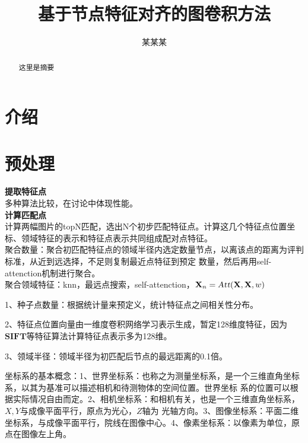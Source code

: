 \documentclass[10pt]{article}
\title{\textbf{基于节点特征对齐的图卷积方法}}
\author{某某某}
\date{}
\begin{document}
\maketitle
\setcounter{page}{0}
\maketitle
\thispagestyle{empty}
\begin{abstract}
	这里是摘要
\end{abstract}

\newpage
{}
\setcounter{page}{1}
\tableofcontents

\newpage
\section{介绍}

\section{预处理}
\indent \textbf{提取特征点}\\
\indent 多种算法比较，在讨论中体现性能。\\
\indent \textbf{计算匹配点}\\
\indent 计算两幅图片的topN匹配，选出N个初步匹配特征点。计算这几个特征点位置坐标、领域特征的表示和特征点表示共同组成配对点特征。\\
\indent 聚合数量：聚合初匹配特征点的领域半径内选定数量节点，以离该点的距离为评判标准，从近到远选择，不足则复制最近点特征到预定
数量，然后再用self-attenction机制进行聚合。\\
\indent 聚合领域特征：knn，最远点搜索，self-attenction，$\textbf{X}_n=\textsl{Att}(\textbf{X},\textbf{X},w)$ 

1、种子点数量：根据统计量来预定义，统计特征点之间相关性分布。

2、特征点位置向量由一维度卷积网络学习表示生成，暂定128维度特征，因为$\textbf{SIFT}$等特征算法计算特征点表示多为128维。

3、领域半径：领域半径为初匹配后节点的最远距离的0.1倍。

\vspace{100pt}
坐标系的基本概念：1、世界坐标系：也称之为测量坐标系，是一个三维直角坐标系，以其为基准可以描述相机和待测物体的空间位置。世界坐标
系的位置可以根据实际情况自由而定。2、相机坐标系：和相机有关，也是一个三维直角坐标系，$X,Y$与成像平面平行，原点为光心，$Z$轴为
光轴方向。3、图像坐标系：平面二维坐标系，与成像平面平行，院线在图像中心。4、像素坐标系：以像素为单位，原点在图像左上角。
\end{document}
